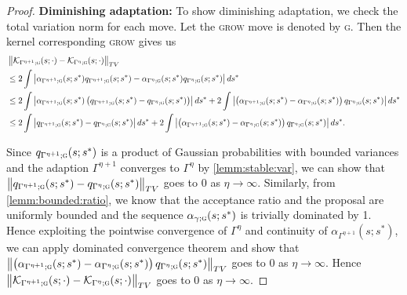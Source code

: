 \documentclass[
12pt]{article}
\begin{document}
\begin{proof}
	\textbf{Diminishing adaptation:}
	To show diminishing adaptation, we check the total variation norm for each move. Let the \textsc{grow} move is denoted by \textsc{g}. Then the kernel corresponding \textsc{grow} gives us
	\begin{align*}
		&\left\|\mathcal{K}_{\Gamma^{\eta+1};\textsc{g}}(s;\cdot)-\mathcal{K}_{\Gamma^{\eta};\textsc{g}}(s;\cdot)\right\|_{TV}\\
		&\le 2\int \left|\alpha_{\Gamma^{\eta+1};\textsc{g}}(s;s^{\ast})q_{\Gamma^{\eta+1};\textsc{g}}(s;s^{\ast}) - \alpha_{\Gamma^{\eta};\textsc{g}}(s;s^{\ast})q_{\Gamma^{\eta};\textsc{g}}(s;s^{\ast})\right|ds^{\ast}\\
		&\le 2\int \left|\alpha_{\Gamma^{\eta+1};\textsc{g}}(s;s^{\ast})\left(q_{\Gamma^{\eta+1};\textsc{g}}(s;s^{\ast}) - q_{\Gamma^{\eta};\textsc{g}}(s;s^{\ast})\right)\right|ds^{\ast} 
		+ 2\int \left|\left(\alpha_{\Gamma^{\eta+1};\textsc{g}}(s;s^{\ast})-\alpha_{\Gamma^{\eta};\textsc{g}}(s;s^{\ast})\right)q_{\Gamma^{\eta};\textsc{g}}(s;s^{\ast})\right|ds^{\ast}\\
		&\le 2\int \left|q_{\Gamma^{\eta+1};\textsc{g}}(s;s^{\ast}) - q_{\Gamma^{\eta};\textsc{g}}(s;s^{\ast})\right|ds^{\ast} 
		+ 2\int \left|\left(\alpha_{\Gamma^{\eta+1};\textsc{g}}(s;s^{\ast})-\alpha_{\Gamma^{\eta};\textsc{g}}(s;s^{\ast})\right)q_{\Gamma^{\eta};\textsc{g}}(s;s^{\ast})\right|ds^{\ast}.
	\end{align*}
	
	Since $q_{\Gamma^{\eta+1};\textsc{g}}(s;s^{\ast})$ is a product of Gaussian probabilities with bounded variances and the adaption $\Gamma^{\eta+1}$ converges to $\Gamma^{\eta}$ by \cref{lemm:stable:var}, we can show that $\left\|q_{\Gamma^{\eta+1};\textsc{g}}(s;s^{\ast})-q_{\Gamma^{\eta};\textsc{g}}(s;s^{\ast})\right\|_{TV}$ goes to 0 as $\eta \to \infty$. Similarly, from \cref{lemm:bounded:ratio}, we know that the acceptance ratio and the proposal are uniformly bounded and the sequence $\alpha_{\gamma;\textsc{g}}(s;s^{\ast})$ is trivially dominated by 1. Hence exploiting the pointwise convergence of $\Gamma^{\eta}$ and continuity of $\alpha_{\Gamma^{\eta+1}}(s;s^{\ast})$, we can apply dominated convergence theorem and show that $\left\|\left(\alpha_{\Gamma^{\eta+1};\textsc{g}}(s;s^{\ast})-\alpha_{\Gamma^{\eta};\textsc{g}}(s;s^{\ast})\right)q_{\Gamma^{\eta};\textsc{g}}(s;s^{\ast})\right\|_{TV}$ goes to 0 as $\eta \to \infty$. Hence $\left\|\mathcal{K}_{\Gamma^{\eta+1};\textsc{g}}(s;\cdot)-\mathcal{K}_{\Gamma^{\eta};\textsc{g}}(s;\cdot)\right\|_{TV}$ goes to 0 as $\eta\to \infty$.
	

\end{proof}
\end{document}

